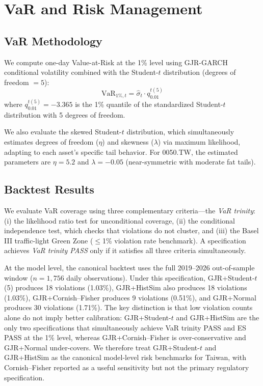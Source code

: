 \section{VaR and Risk Management}
\label{sec:var}

\subsection{VaR Methodology}

We compute one-day Value-at-Risk at the 1\% level using GJR-GARCH conditional volatility combined with the Student-$t$ distribution (degrees of freedom $= 5$):
\begin{equation}
\text{VaR}_{1\%,t} = \hat{\sigma}_t \cdot q_{0.01}^{t(5)}
\label{eq:var}
\end{equation}
where $q_{0.01}^{t(5)} = -3.365$ is the 1\% quantile of the standardized Student-$t$ distribution with 5 degrees of freedom.

We also evaluate the skewed Student-$t$ distribution, which simultaneously estimates degrees of freedom ($\eta$) and skewness ($\lambda$) via maximum likelihood, adapting to each asset's specific tail behavior. For 0050.TW, the estimated parameters are $\eta = 5.2$ and $\lambda = -0.05$ (near-symmetric with moderate fat tails).

\subsection{Backtest Results}

We evaluate VaR coverage using three complementary criteria---the \textit{VaR trinity}: (i) the \citet{kupiec1995} likelihood ratio test for unconditional coverage, (ii) the \citet{christoffersen1998} conditional independence test, which checks that violations do not cluster, and (iii) the Basel III traffic-light Green Zone ($\leq$1\% violation rate benchmark). A specification achieves \textit{VaR trinity PASS} only if it satisfies all three criteria simultaneously.

At the model level, the canonical backtest uses the full 2019--2026 out-of-sample window ($n = 1{,}756$ daily observations). Under this specification, GJR+Student-$t$(5) produces 18 violations (1.03\%), GJR+HistSim also produces 18 violations (1.03\%), GJR+Cornish--Fisher produces 9 violations (0.51\%), and GJR+Normal produces 30 violations (1.71\%). The key distinction is that low violation counts alone do not imply better calibration: GJR+Student-$t$ and GJR+HistSim are the only two specifications that simultaneously achieve VaR trinity PASS and ES PASS at the 1\% level, whereas GJR+Cornish--Fisher is over-conservative and GJR+Normal under-covers. We therefore treat GJR+Student-$t$ and GJR+HistSim as the canonical model-level risk benchmarks for Taiwan, with Cornish--Fisher reported as a useful sensitivity but not the primary regulatory specification.

